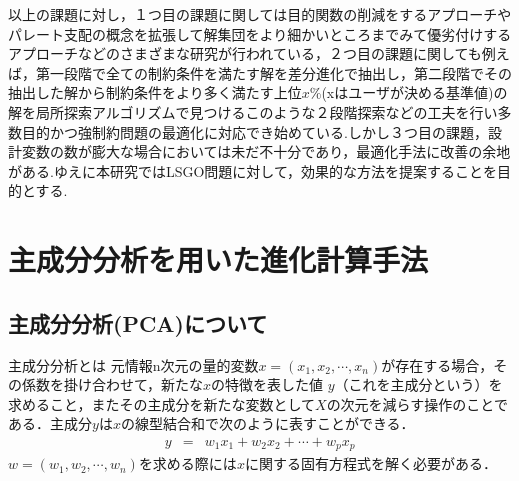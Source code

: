 \documentclass[11pt,a4j,notitlepage]{jsarticle}
\begin{document}
\vspace{-1.5zh}
以上の課題に対し，１つ目の課題に関しては目的関数の削減をするアプローチ\cite{Deb1}やパレート支配の概念を拡張して解集団をより細かいところまでみて優劣付けするアプローチ\cite{HSato}などのさまざまな研究が行われている，２つ目の課題に関しても例えば，第一段階で全ての制約条件を満たす解を差分進化で抽出し，第二段階でその抽出した解から制約条件をより多く満たす上位$x\%$(xはユーザが決める基準値)の解を局所探索アルゴリズムで見つける\cite{Yo}このような２段階探索などの工夫を行い多数目的かつ強制約問題の最適化に対応でき始めている.しかし３つ目の課題，設計変数の数が膨大な場合においては未だ不十分であり，最適化手法に改善の余地がある.ゆえに本研究ではLSGO問題に対して，効果的な方法を提案することを目的とする.
\vspace{-1.5zh}
\section{主成分分析を用いた進化計算手法}
\vspace{-1.5zh}
\subsection{主成分分析(PCA)について}
\vspace{-1.0zh}
主成分分析とは
元情報n次元の量的変数$x=(x_1,x_2,\cdots ,x_n)$が存在する場合，その係数を掛け合わせて，新たな$x$の特徴を表した値 $y$（これを主成分という）を求めること，またその主成分を新たな変数として$X$の次元を減らす操作のことである．主成分$y$は$x$の線型結合和で次のように表すことができる．
\begin{eqnarray}
  y&=&w_1x_1+w_2x_2+\cdots+w_px_p
\end{eqnarray}
$w=(w_1,w_2,\cdots ,w_n)$を求める際には$x$に関する固有方程式を解く必要がある．
\vspace{-1.5zh}
\end{document}
